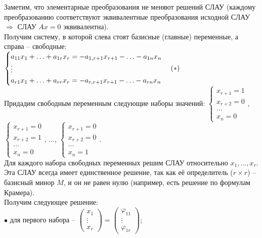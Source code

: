 \documentclass[11pt,a4paper]{article}
\begin{document}
Заметим, что элементарные преобразования не меняют решений СЛАУ (каждому преобразованию соответствуют эквивалентные преобразования исходной СЛАУ $\Rightarrow$ СЛАУ $Ax = 0$ эквивалентна).\\
Получим систему, в которой слева стоят базисные (главные) переменные, а справа -- свободные:\\
$\begin{cases}
a_{11} x_1 + \hdots + a_{1r} x_r = -a_{1, r+1} x_{r+1} - \hdots - a_{1n} x_n \\
\vdots \\
a_{r1} x_1 + \hdots + a_{rr} x_r = -a_{r, r+1} x_{r+1} - \hdots - a_{rn} x_n \\
\end{cases}\hfill(*)$\\
Придадим свободным переменным следующие наборы значений:
$\begin{cases}
x_{r+1} = 1 \\
x_{r+2} = 0 \\
\hdots \\
x_n = 0
\end{cases}$,
$\begin{cases}
x_{r+1} = 0 \\
x_{r+2} = 1 \\
\hdots \\
x_n = 0
\end{cases}$,
$\hdots$,
$\begin{cases}
x_{r+1} = 0 \\
x_{r+2} = 0 \\
\hdots \\
x_n = 1
\end{cases}$.\\
Для каждого набора свободных переменных решим СЛАУ относительно $x_1, \hdots, x_r$. Эта СЛАУ всегда имеет единственное решение, так как её определитель ($r \times r$) -- базисный минор $M$, и он не равен нулю (например, есть решение по формулам Крамера).\\
Получим следующее решение:\\
$\bullet$ для первого набора --
$\left( \begin{matrix}
x_1 \\
\vdots \\
x_r
\end{matrix} \right) =
\left( \begin{matrix}
\varphi_{11} \\
\vdots \\
\varphi_{1r}
\end{matrix} \right)$;\\
\end{document}
